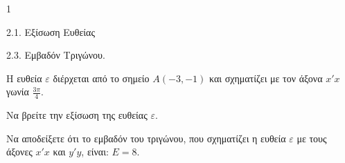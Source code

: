 \begin{ylh}{1}
    \item 2.1. Εξίσωση Ευθείας
    \item 2.3. Εμβαδόν Τριγώνου.
\end{ylh}
Η ευθεία $\varepsilon$ διέρχεται από το σημείο $A(-3, -1)$ και σχηματίζει με τον άξονα $x'x$ γωνία $\frac{3\pi}{4}$.
\begin{alist}
\item Να βρείτε την εξίσωση της ευθείας $\varepsilon$. 
\item Να αποδείξετε ότι το εμβαδόν του τριγώνου, που σχηματίζει η ευθεία $\varepsilon$ με τους άξονες $x'x$ και $y'y$, είναι: $E = 8$. 
\end{alist}